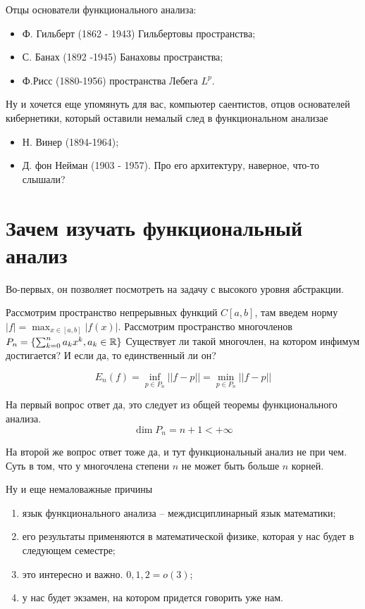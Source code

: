 \documentclass[document]{subfiles}
\begin{document}
Отцы основатели функционального анализа:
\begin{itemize}
    \item Ф. Гильберт (1862 - 1943) Гильбертовы пространства;
    \item С. Банах (1892 -1945) Банаховы пространства;
    \item Ф.Рисс (1880-1956) пространства Лебега $L^p$.
\end{itemize}
Ну и хочется еще упомянуть для вас, компьютер саентистов, отцов основателей кибернетики, который оставили немалый след в функциональном анализае
\begin{itemize}
    \item Н. Винер (1894-1964);
    \item Д. фон Нейман (1903 - 1957). Про его архитектуру, наверное, что-то слышали?
\end{itemize}

\section{Зачем изучать функциональный анализ}
Во-первых, он позволяет посмотреть на задачу с высокого уровня абстракции.

Рассмотрим пространство непрерывных функций $C[a,b]$, там введем норму $|f| = \max_{x \in [a,b]} | f(x)|. $ Рассмотрим пространство многочленов $P_n = \{ \sum^n_{k=0} a_kx^k, a_k \in \mathbb{R} \}$
Существует ли такой многочлен, на котором инфимум достигается? И если да, то единственный ли он? 

\[ E_n (f) = \inf_{p \in P_n} || f - p||  = \min_{p \in P_n} ||f - p|| \]


На первый вопрос ответ да, это следует из общей теоремы функционального анализа. 
\[ \dim P_n = n + 1 < + \infty \]

На второй же вопрос ответ тоже да, и тут функциональный анализ не при чем. Суть в том, что у многочлена степени $n$ не может быть больше $n$ корней.

Ну и еще немаловажные причины
\begin{enumerate}
    \item язык функционального анализа -- междисциплинарный язык математики;
    \item его результаты применяются в математической физике, которая у нас будет в следующем семестре;
    \item это интересно и важно.  $0,1,2 = o(3)$;
    \item у нас будет экзамен, на котором придется говорить уже нам.
\end{enumerate}
\end{document}
